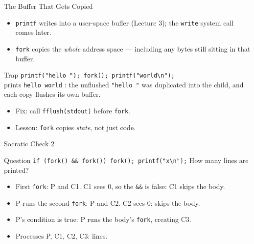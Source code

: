 \documentclass[aspectratio=169]{beamer}
\begin{document}
\begin{frame}{The Buffer That Gets Copied}
  \begin{itemize}
    \item \texttt{printf} writes into a user-space buffer (Lecture 3); the
      \texttt{write} system call comes later.
    \item \texttt{fork} copies the \emph{whole} address space ---
      including any bytes still sitting in that buffer.
  \end{itemize}
  \vspace{0.1cm}
  \begin{alertblock}{Trap}
    \texttt{printf("hello "); fork(); printf("world\textbackslash n");}\\
    prints \texttt{hello world} : the unflushed \texttt{"hello "}
    was duplicated into the child, and each copy flushes its own buffer.
  \end{alertblock}
  \begin{itemize}
    \item Fix: call \texttt{fflush(stdout)} before \texttt{fork}.
    \item Lesson: \texttt{fork} copies \emph{state}, not just code.
  \end{itemize}
\end{frame}

\begin{frame}{Socratic Check 2}
  \begin{block}{Question}
    \texttt{if (fork() \&\& fork()) fork(); printf("x\textbackslash n");}
    How many lines are printed?
  \end{block}
  \vspace{0.25cm}
  \begin{itemize}
    \item First \texttt{fork}: P and C1. C1 sees 0, so the \texttt{\&\&} is
      false: C1 skips the body.
    \item P runs the second \texttt{fork}: P and C2. C2 sees 0: skips the body.
    \item P's condition is true: P runs the body's \texttt{fork}, creating C3.
    \item Processes P, C1, C2, C3:  lines. 
  \end{itemize}
\end{frame}

\end{document}
